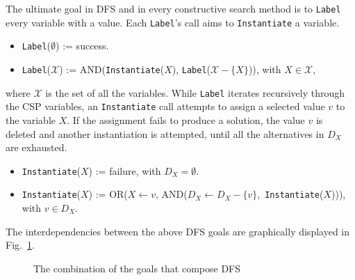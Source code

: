 \documentclass{ws-ijait}
\begin{document}
The ultimate goal in DFS and in every constructive search
method is to \texttt{Label} every variable with a value.
Each \texttt{Label}'s call aims to \texttt{Instantiate} a
variable.
\begin{itemize}
  \item \texttt{Label}($\emptyset$) := \textsf{success}.
  \item \texttt{Label}($\mathscr{X}$) :=
          \textsf{AND}(\texttt{Instantiate}($X$),
            \texttt{Label}($\mathscr{X} \! - \! \{X\}$)),
        with $X \in \mathscr{X}$,
\end{itemize}
where $\mathscr{X}$ is the set of all the variables. While
\texttt{Label} iterates recursively through the CSP
variables, an \texttt{Instantiate} call attempts to assign a
selected value $v$ to the variable $X$. If the assignment
fails to produce a solution, the value $v$ is deleted and
another instantiation is attempted, until all the
alternatives in $D_X$ are exhausted.
\begin{itemize}
  \item \texttt{Instantiate}($X$) := \textsf{failure},
          with $D_X = \emptyset$.
  \item \texttt{Instantiate}($X$) :=
          \textsf{OR}($X \! \gets \! v$,
            \textsf{AND}($D_X \!\! \gets \!\!
            D_X \!\! - \!\! \{v\}$,\,
            \texttt{Instantiate}($X$))), with $v \in D_X$.
\end{itemize}
The interdependencies between the above DFS goals are
graphically displayed in Fig.~\ref{DFS}.

\begin{figure}
  \centering
  \caption{The combination of the goals that compose
           DFS\label{DFS}}
\end{figure}
\end{document}
